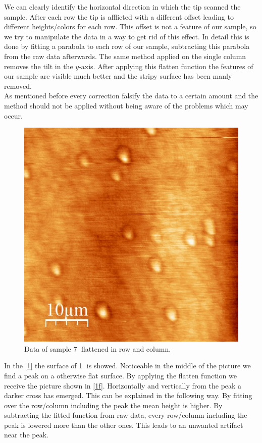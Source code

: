 \documentclass[paper=a4,fontsize=10pt,DIV=18,twocolumn,parskip=half]{scrartcl}
\numberwithin{equation}{section}    %
\begin{document}
We can clearly identify the horizontal direction in which the tip scanned the sample. After each row the tip is afflicted with a different offset leading to different heights/colors for each row. This offset is not a feature of our sample, so we try to manipulate the data in a way to get rid of this effect.
In detail this is done by fitting a parabola to each row of our sample, subtracting this parabola from the raw data afterwards. The same method applied on the single column removes the tilt in the $y$-axis. After applying this flatten function the features of our sample are visible much better and the stripy surface has been manly removed. \\
As mentioned before every correction falsify the data to a certain amount and the method should not be applied without being aware of the problems which may occur.

\begin{figure}[htp]
    \begin{center}
        \includegraphics[width=0.7\columnwidth]{Bilder/7f}
        \caption{Data of sample \textcircled{7} flattened in row and column. }
        \label{7f}
    \end{center}
\end{figure}

In the \ref{1} the surface of \textcircled{1} is showed. Noticeable in the middle of the picture we find a peak on a otherwise flat surface. By applying the flatten function we receive the picture shown in \ref{1f}. Horizontally and vertically from the peak a darker cross has emerged. This can be explained in the following way. By fitting over the row/column including the peak the mean height is higher. By subtracting the fitted function from raw data, every row/column including the peak is lowered more than the other ones. This leads to an unwanted artifact near the peak.
\end{document}
